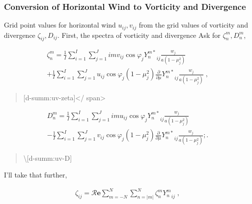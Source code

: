 \hypertarget{conversion-of-horizontal-wind-to-vorticity-and-divergence}{%
\subsubsection{Conversion of Horizontal Wind to Vorticity and
Divergence}\label{conversion-of-horizontal-wind-to-vorticity-and-divergence}}

Grid point values for horizontal wind \(u_{ij}, v_{ij}\) from the grid
values of vorticity and divergence \(\zeta_{ij}, D_{ij}\). First, the
spectra of vorticity and divergence Ask for \(\zeta_n^m, D_n^m\),

\begin{eqnarray}
\zeta_n^m  =  \frac{1}{I} \sum_{i=1}^{I} \sum_{j=1}^{J}  
                  im v_{ij} \cos\varphi_j {Y_n^{m*}}_{ij}
                \frac{w_j}{a(1-\mu_j^{2})}
                 \\
           +    \frac{1}{I} \sum_{i=1}^{I} \sum_{j=1}^{J}  
                     u_{ij} \cos\varphi_j (1-\mu_j^2)
                  \frac{\partial }{\partial \mu} {Y_n^{m*}}_{ij}
                 \frac{w_j}{a(1-\mu_j^{2})} \; ,
\end{eqnarray}

\begin{quote}
{[}d-summ:uv-zeta{]}\textless/ span\textgreater{}
\end{quote}

\begin{eqnarray}
    D_n^m  =  \frac{1}{I} \sum_{i=1}^{I} \sum_{j=1}^{J}  
                  im u_{ij} \cos\varphi_j {Y_n^{m*}}_{ij}
                \frac{w_j}{a(1-\mu_j^{2})}
                 \\
           -    \frac{1}{I} \sum_{i=1}^{I} \sum_{j=1}^{J}  
                  v_{ij} \cos\varphi_j  (1-\mu_j^2)
                  \frac{\partial }{\partial \mu} {Y_n^{m*}}_{ij}
                 \frac{w_j}{a(1-\mu_j^{2})} ; .
\end{eqnarray}

\begin{quote}
\protect\hypertarget{d-summ:uv-D}{}{\textbackslash{[}d-summ:uv-D{]}}
\end{quote}

I'll take that further,

\begin{eqnarray}
  \zeta_{ij}
   =  {\mathcal R}\mathbf{e} \sum_{m=-N}^{N} \sum_{n=|m|}^{N}
      \zeta_n^m  {Y_n^m}_{ij} \; ,
\end{eqnarray}

